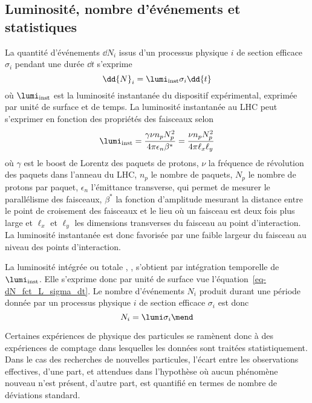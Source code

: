 \subsection{Luminosité, nombre d'événements et statistiques}\label{chapter-LHC-section-LHC-subsec-lumi}
La quantité d'événements $\dd{N}_i$ issus d'un processus physique $i$ de section efficace $\sigma_i$ pendant une durée $\dd{t}$ s'exprime
\begin{equation}
\dd{N}_i = \lumi_\text{inst} \sigma_i \dd{t}
\label{eq-dN_fct_L_sigma_dt}
\end{equation}
où $\lumi_\text{inst}$ est la luminosité instantanée du dispositif expérimental, exprimée par unité de surface et de temps.
La luminosité instantanée au LHC peut s'exprimer en fonction des propriétés des faisceaux selon
\begin{equation}
\lumi_\text{inst}
= \frac{\gamma\nu n_p N_p^2}{4\pi\epsilon_n\beta^*}
= \frac{\nu n_p N_p^2}{4\pi\ell_x\ell_y}
\end{equation}
où
$\gamma$ est le boost de Lorentz des paquets de protons,
$\nu$ la fréquence de révolution des paquets dans l'anneau du LHC,
$n_p$ le nombre de paquets,
$N_p$ le nombre de protons par paquet,
$\epsilon_n$ l'émittance transverse, qui permet de mesurer le parallélisme des faisceaux,
$\beta^*$ la fonction d'amplitude mesurant la distance entre le point de croisement des faisceaux et le lieu où un faisceau est deux fois plus large et
$\ell_x$ et $\ell_y$ les dimensions transverses du faisceau au point d'interaction.
La luminosité instantanée est donc favorisée par une faible largeur du faisceau au niveau des points d'interaction.
\par
La luminosité intégrée ou \og totale \fg, \lumi, s'obtient par intégration temporelle de $\lumi_\text{inst}$.
Elle s'exprime donc par unité de surface vue l'équation~\eqref{eq-dN_fct_L_sigma_dt}.
Le nombre d'événements $N_i$ produit durant une période donnée par un processus physique $i$ de section efficace $\sigma_i$ est donc
\begin{equation}
N_i = \lumi \sigma_i
\mend
\end{equation}
\par Certaines expériences de physique des particules se ramènent donc à des expériences de comptage dans lesquelles les données sont traitées statistiquement.
Dans le cas des recherches de nouvelles particules, l'écart entre les observations effectives, d'une part, et attendues dans l'hypothèse où aucun phénomène nouveau n'est présent, d'autre part, est quantifié en termes de nombre de déviations standard.

